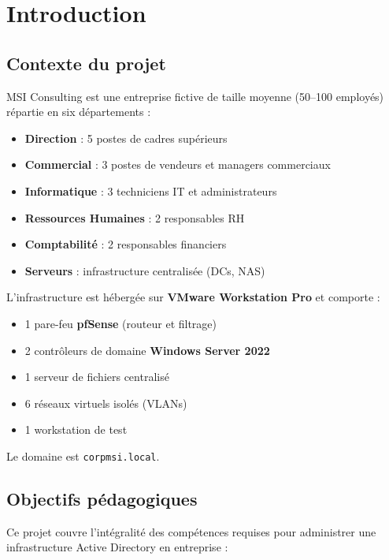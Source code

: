 \chapter{Introduction}

\section{Contexte du projet}

MSI Consulting est une entreprise fictive de taille moyenne (50–100 employés) répartie en six départements :
\begin{itemize}
    \item \textbf{Direction} : 5 postes de cadres supérieurs
    \item \textbf{Commercial} : 3 postes de vendeurs et managers commerciaux
    \item \textbf{Informatique} : 3 techniciens IT et administrateurs
    \item \textbf{Ressources Humaines} : 2 responsables RH
    \item \textbf{Comptabilité} : 2 responsables financiers
    \item \textbf{Serveurs} : infrastructure centralisée (DCs, NAS)
\end{itemize}

L'infrastructure est hébergée sur \textbf{VMware Workstation Pro} et comporte :
\begin{itemize}
    \item 1 pare-feu \textbf{pfSense} (routeur et filtrage)
    \item 2 contrôleurs de domaine \textbf{Windows Server 2022}
    \item 1 serveur de fichiers centralisé
    \item 6 réseaux virtuels isolés (VLANs)
    \item 1 workstation de test
\end{itemize}

Le domaine est \texttt{corpmsi.local}.

\section{Objectifs pédagogiques}

Ce projet couvre l'intégralité des compétences requises pour administrer une infrastructure Active Directory en entreprise :

